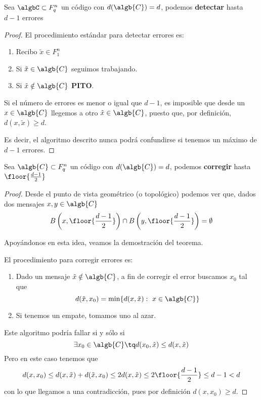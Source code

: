 \begin{theorem}
Sea $\algbC \subset F_q^n$ un código con $d(\algb{C})=d$, podemos \textbf{detectar} hasta $d-1$ errores
\end{theorem}
\begin{proof}
El procedimiento estándar para detectar errores es:
\begin{enumerate}
\item Recibo $\tilde{x} \in F_1^n$

\item Si $\tilde{x}  \in \algb{C}$ seguimos trabajando.

\item Si $\tilde{x} \notin  \algb{C}$ \textbf{PITO}.
\end{enumerate}

Si el número de errores es menor o igual que $d-1$, es imposible que desde un $x\in \algb{C}$ llegemos a otro $\tilde{x} \in \algb{C}$, puesto que, por definición, $d(x,\tilde{x})\geq d$.

Es decir, el algoritmo descrito nunca podrá confundirse si tenemos un máximo de $d-1$ errores.
\end{proof}

\begin{theorem}
Sea $\algb{C} \subset F_q^n$ un código con $d(\algb{C})=d$, podemos \textbf{corregir} hasta $\floor{\frac{d-1}{2}}$
\end{theorem}
\begin{proof}
Desde el punto de vista geométrico (o topológico) podemos ver que, dados dos mensajes $x,y \in \algb{C}$
\[B\left(x,\floor{\frac{d-1}{2}}\right) \cap B\left(y,\floor{\frac{d-1}{2}}\right) = \emptyset\]

Apoyándonos en esta idea, veamos la demostración del teorema.

El procedimiento para corregir errores es:
\begin{enumerate}
\item Dado un mensaje $\tilde{x} \notin \algb{C}$, a fin de corregir el error buscamos $x_0$ tal que
\[d(\tilde{x},x_0)=\min\{d(x,\tilde{x}): \ x\in \algb{C}\}\]

\item Si tenemos un empate, tomamos uno al azar.
\end{enumerate}

Este algoritmo podría fallar si y sólo si
\[\exists x_0 \in \algb{C} \tq d(x_0,\tilde{x}) \leq d(x,\tilde{x})\]
Pero en este caso tenemos que
\[d(x,x_0) \leq d(x,\tilde{x})+d(\tilde{x},x_0) \leq 2d(x,\tilde{x}) \leq 2 \floor{\frac{d-1}{2}} \leq d-1 < d\]
con lo que llegamos a una contradicción, pues por definición $d(x,x_0)\geq d$.
\end{proof}

